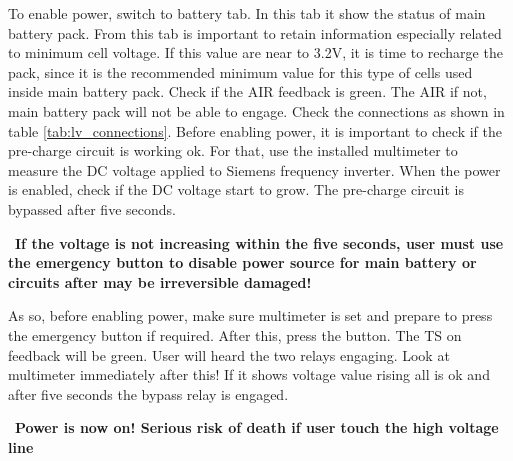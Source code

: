 To enable power, switch to battery tab. In this tab it show the status of main battery pack. From this tab is important to retain information especially related to minimum cell voltage. If this value are near to 3.2V, it is time to recharge the pack, since it is the recommended minimum value for this type of cells used inside main battery pack.
Check if the \gls{AIR} feedback is green. The \gls{AIR} if not, main battery pack will not be able to engage. Check the connections as shown in table \ref{tab:lv_connections}. 
Before enabling power, it is important to check if the pre-charge circuit is working ok.
For that, use the installed multimeter to measure the \gls{DC} voltage applied to Siemens frequency inverter. When the power is enabled, check if the \gls{DC} voltage start to grow. The pre-charge circuit is bypassed after five seconds. 
\begin{mdframed}[backgroundcolor=red!20, roundcorner=10pt, innertopmargin=5pt, innerbottommargin=5pt, skipabove=5pt]
	\Warning \, \textbf{If the voltage is not increasing within the five seconds, user must use the emergency button to disable power source for main battery or circuits after may be irreversible damaged!}
\end{mdframed}

As so, before enabling power, make sure multimeter is set and prepare to press the emergency button if required. After this, press the  button. The TS on feedback will be green. User will heard the two relays engaging. Look at multimeter immediately after this! If it shows voltage value rising all is ok and after five seconds the bypass relay is engaged. 
\begin{mdframed}[backgroundcolor=red!20, roundcorner=10pt, innertopmargin=5pt, innerbottommargin=5pt, skipabove=5pt]
	\Warning \, \textbf{Power is now on! Serious risk of death if user touch the high voltage line}
\end{mdframed}
	
